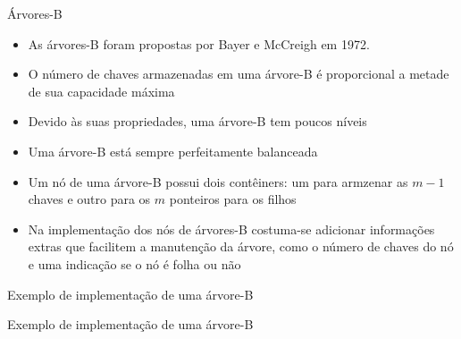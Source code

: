 \begin{frame}[fragile]{Árvores-B}

	\begin{itemize}
		\item As árvores-B foram propostas por Bayer e McCreigh em 1972.

		\item O número de chaves armazenadas em uma árvore-B é proporcional a metade de 
            sua capacidade máxima

		\item Devido às suas propriedades, uma árvore-B tem poucos níveis

		\item Uma árvore-B está sempre perfeitamente balanceada

		\item Um nó de uma árvore-B possui dois contêiners: um para armzenar as $m-1$ chaves e 
            outro para os  $m$ ponteiros para os filhos

		\item Na implementação dos nós de árvores-B costuma-se adicionar informações extras que 
            facilitem a manutenção da árvore, como o número de chaves do nó e uma indicação se o 
            nó é folha ou não
	\end{itemize}

\end{frame}

\begin{frame}[fragile]{Exemplo de implementação de uma árvore-B}
\end{frame}

\begin{frame}[fragile]{Exemplo de implementação de uma árvore-B}
\end{frame}
